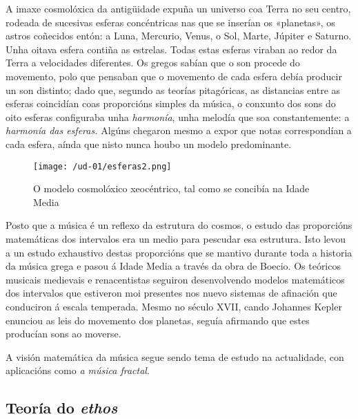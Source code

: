 A imaxe cosmolóxica da antigüidade expuña un universo coa Terra no seu
centro, rodeada de sucesivas esferas concéntricas nas que se inserían os
«planetas», os astros coñecidos entón: a Luna, Mercurio, Venus, o Sol,
Marte, Júpiter e Saturno. Unha oitava esfera contiña as estrelas. Todas
estas esferas viraban ao redor da Terra a velocidades diferentes. Os
gregos sabían que o son procede do movemento, polo que pensaban que o
movemento de cada esfera debía producir un son distinto; dado que,
segundo as teorías pitagóricas, as distancias entre as esferas
coincidían coas proporcións simples da música, o conxunto dos sons do
oito esferas configuraba unha \emph{harmonía}, unha melodía que soa
constantemente: a \emph{harmonía das esferas.} Algúns chegaron mesmo a
expor que notas correspondían a cada esfera, aínda que nisto nunca houbo
un modelo predominante.

\begin{figure}[htp]
\centering
\texttt{[image: /ud-01/esferas2.png]}
\caption{O modelo cosmolóxico xeocéntrico, tal como se concibía na Idade Media}
\end{figure}


Posto que a música é un reflexo da estrutura do cosmos, o estudo das
proporcións matemáticas dos intervalos era un medio para pescudar esa
estrutura. Isto levou a un estudo exhaustivo destas proporcións que se
mantivo durante toda a historia da música grega e pasou á Idade Media a
través da obra de Boecio. Os teóricos musicais medievais e renacentistas
seguiron desenvolvendo modelos matemáticos dos intervalos que estiveron
moi presentes nos nuevo sistemas de afinación que conduciron á escala
temperada. Mesmo no século XVII, cando Johannes Kepler enunciou as leis
do movemento dos planetas, seguía afirmando que estes producían sons ao
moverse.

A visión matemática da música segue sendo tema de estudo na actualidade,
con aplicacións como \emph{a música fractal}.


\subsection*{\texorpdfstring{Teoría do
\emph{ethos}}{Teoría do ethos}}\label{teoruxeda-do--ethos}

